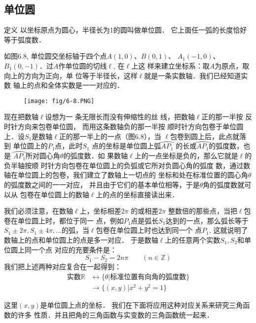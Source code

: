 \subsection{单位圆}
\begin{blk}{定义}
    以坐标原点为圆心，半径长为1的圆叫做单位圆．
它上面任一弧的长度恰好等于弧度数．
\end{blk}
 
如图6.8, 单位圆交坐标轴于四个点$A(1,0)$、$B(0,1)$、
$A_1(-1,0)$、$B_1(0,-1)$．过$A$作单位圆的切线$\ell$, 在$\ell$上这
样来建立坐标系：取$A$为原点，取向上的方向为正向，单
位等于半径长，这样$\ell$就是一条实数轴．我们已经知道实数
轴上的点和全体实数是一一对应的．

\begin{figure}[htp]
    \centering
\texttt{[image: fig/6-8.PNG]}
    \caption{}
\end{figure}



现在把数轴$\ell$设想为一
条无限长而没有伸缩性的丝
线，把数轴$\ell$正的那一半按
反时针方向来包卷单位圆，
而用这条数轴负的那一半按
顺时针方向包卷于单位圆上．设$S_1$是数轴$\ell$正的那一半上的一点（图6.8），当
$\ell$包卷到圆上后，此点就落到
单位圆上的$P_1$点，此时$S_1$
点的坐标是单位圆上弧$\wideparen{AP_1}$
的长或$\wideparen{AP_1}$的弧度数，也是
$\wideparen{AP_1}$所对圆心角$\theta$的弧度数．如
果数轴$\ell$上的一点坐标是负的，那么它就是$\ell$的负半轴按顺
时针方向包卷在单位圆上的负弧或它所对负圆心角的弧度
数，通过数轴在单位圆上的包卷，我们建立了数轴上一切点的
坐标和处在标准位置的圆心角$\theta$的弧度数之间的一一对应，
并且由于它们的基本单位相等，于是$\theta$角的弧度数就可以从
包卷在单位圆上的数轴$\ell$上的点的坐标直接读出来．

我们必须注意，在数轴$\ell$上，坐标相差$2\pi$ 的或相差$2\pi$ 
整数倍的那些点，当把$\ell$包卷在单位圆上时，都位于同一
点，例如$P_1$点是弧长$S_1$达到的一点，那么弧长等于$S_1\pm 2\pi,
S_1\pm 4\pi ,\ldots$的弧，当$\ell$包卷在单位圆上时也达到同一个
点$P_1$, 这就说明了数轴上的点和单位圆上的点是多一对应．
于是数轴$\ell$上的任意两个实数$S_1,S_2$和单位圆上同一个点
对应的充要条件是：
\[S_1-S_2=2n\pi \qquad  (n\in\mathbb{Z})\]
我们把上述两种对应复合在一起得到：
\begin{align*}
    \text{实数}\mathbb{R}& \longleftrightarrow  \{\theta|\text{标准位置有向角的弧度数}\}  \tag{一一对应}\\
& \longrightarrow \{(x,y)|x^2+y^2=1\} \tag{多一对应}
\end{align*}

这里$(x,y)$是单位圆上点的坐标．
我们在下面将应用这种对应关系来研究三角函数的许多
性质．并且把角的三角函数与实变数的三角函数统一起来．


